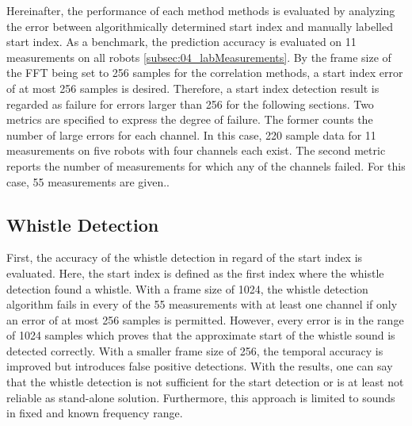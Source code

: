Hereinafter, the performance of each method methods is evaluated by
analyzing the error between algorithmically determined start index
and manually labelled start index.
As a benchmark, the prediction accuracy is evaluated on 11 measurements on all
robots \cref{subsec:04_labMeasurements}.
By the frame size of the \ac{FFT} being set to 256 samples for the
correlation methods, a start index error of at most 256 samples is
desired.
Therefore, a start index detection result is regarded as failure for errors
larger than 256 for the following sections.
Two metrics are specified to express the degree of failure.
The former counts the number of large errors for each channel.
In this case, 220 sample data for 11 measurements on five robots with
four channels each exist.
The second metric reports the number of measurements for which any of the
channels failed. For this case, 55 measurements are given..

\subsection{Whistle Detection}
\label{subsec:04_whistleDetection}

First, the accuracy of the whistle detection in regard of the start index
is evaluated.
Here, the start index is defined as the first index where the whistle detection
found a whistle.
With a frame size of 1024, the whistle detection algorithm fails in every of the
55 measurements with at least one channel if only an error of at most 256 samples
is permitted.
However, every error is in the range of 1024 samples which proves that the
approximate start of the whistle sound is detected correctly.
With a smaller frame size of 256, the temporal accuracy is improved but
introduces false positive detections.
With the results, one can say that the whistle detection is not sufficient
for the start detection or is at least not reliable as stand-alone solution.
Furthermore, this approach is limited to sounds in fixed and known frequency range.

